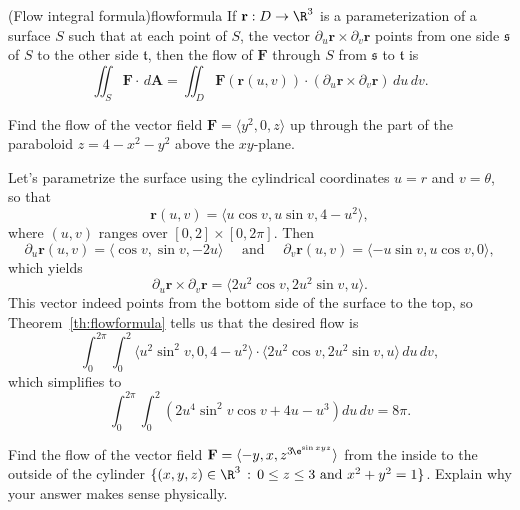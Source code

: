 \documentclass[indent]{watsonbook}
\begin{document}
\begin{theo}{(Flow integral formula)}{flowformula}
  If $\mathbf{r}:D \to \R^3$ is a parameterization of a surface $S$
  such that at each point of $S$, the vector
  $\partial_u \mathbf{r} \times \partial_v \mathbf{r}$ points from one
  side $\mathfrak{s}$ of $S$ to the other side $\mathfrak{t}$, then
  the flow of $\mathbf{F}$ through $S$ from $\mathfrak{s}$ to
  $\mathfrak{t}$ is 
  \begin{equation} \label{eq:surfformula}
    \iint_S \mathbf{F}\cdot \, {{d}}\mathbf{A} = \iint_D
    \mathbf{F}(\mathbf{r}(u,v)) \cdot (\partial_u
    \mathbf{r} \times \partial_v \mathbf{r}) \, {{d}}u\,{{d}}v.
  \end{equation}
\end{theo}

\begin{example}{}{}
  Find the flow of the vector field $\mathbf{F} = \langle y^2, 0, z
  \rangle$ up through the part of the paraboloid $z = 4 - x^2 - y^2$
  above the $xy$-plane.
\end{example}

\begin{solution}
  Let's parametrize the surface using the cylindrical coordinates $u=r$
  and $v=\theta$, so that
  \[
    \mathbf{r}(u,v) = \langle u\cos v, u \sin v, 4 - u^2 \rangle,
  \]
  where $(u,v)$ ranges over $[0,2] \times [0,2\pi]$. Then
  \[
    \partial_u \mathbf{r}(u,v) = \langle \cos v, \sin v, -2u \rangle \quad \text{ and } \quad
    \partial_v \mathbf{r}(u,v) = \langle -u\sin v, u \cos v, 0
    \rangle,
  \]
  which yields
  \[
    \partial_u\mathbf{r} \times \partial_v \mathbf{r} = \langle 2 u^{2} \cos v,2 u^{2} \sin v, u \rangle.
  \]
  This vector indeed points from the bottom side of the surface to the
  top, so Theorem~\ref{th:flowformula} tells us that the desired flow
  is
  \[
    \int_{0}^{2\pi}\int_{0}^{2} \langle u^2 \sin^2 v, 0, 4-u^2
    \rangle \cdot \langle 2 u^{2} \cos v,2 u^{2} \sin v, u \rangle \,
    {d} u \, {d}{v},
  \]
  which simplifies to
  \[
    \int_{0}^{2\pi}\int_{0}^{2} (2 u^4 \sin^2 v \cos v + 4u - u^3)
    {d} u \, {d}{v} = \boxed{8\pi}.
  \]
\end{solution}

\begin{exercise}{}{}
  Find the flow of the vector field $\mathbf{F} = \langle -y, x,
  z^{3\hspace{-1pt}\e^{\sin xyz}}\rangle$
  from the inside to the outside of the cylinder $\{(x,y,z) \in \R^3
  \,: \, 0 \leq z \leq 3 \text{ and } x^2 + y^2 = 1\}$. Explain why
  your answer makes sense physically.
\end{exercise}
\end{document}
